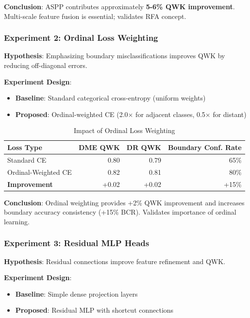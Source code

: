 \documentclass[12pt,a4paper]{article}
\begin{document}
\textbf{Conclusion}: ASPP contributes approximately \textbf{5-6\% QWK improvement}. Multi-scale feature fusion is essential; validates RFA concept.

\subsubsection{Experiment 2: Ordinal Loss Weighting}

\textbf{Hypothesis}: Emphasizing boundary misclassifications improves QWK by reducing off-diagonal errors.

\textbf{Experiment Design}:
\begin{itemize}
    \item \textbf{Baseline}: Standard categorical cross-entropy (uniform weights)
    \item \textbf{Proposed}: Ordinal-weighted CE (2.0× for adjacent classes, 0.5× for distant)
\end{itemize}

\begin{table}[H]
\centering
\small
\caption{Impact of Ordinal Loss Weighting}
\begin{tabular}{|l|r|r|r|}
\hline
\textbf{Loss Type} & \textbf{DME QWK} & \textbf{DR QWK} & \textbf{Boundary Conf. Rate} \\
\hline
Standard CE & 0.80 & 0.79 & 65\% \\
Ordinal-Weighted CE & 0.82 & 0.81 & 80\% \\
\hline
\textbf{Improvement} & +0.02 & +0.02 & +15\% \\
\hline
\end{tabular}
\end{table}

\textbf{Conclusion}: Ordinal weighting provides +2\% QWK improvement and increases boundary accuracy consistency (+15\% BCR). Validates importance of ordinal learning.

\subsubsection{Experiment 3: Residual MLP Heads}

\textbf{Hypothesis}: Residual connections improve feature refinement and QWK.

\textbf{Experiment Design}:
\begin{itemize}
    \item \textbf{Baseline}: Simple dense projection layers
    \item \textbf{Proposed}: Residual MLP with shortcut connections
\end{itemize}
\end{document}
